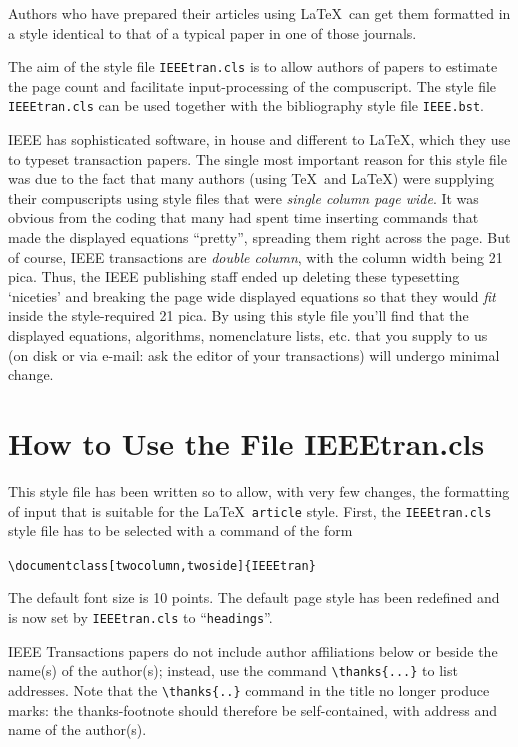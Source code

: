 \documentclass[journal,transmag]{IEEEtran}
\begin{document}
Authors who have prepared their articles using \LaTeX\
can get them formatted in a style identical to that of a typical paper
in one of those journals.

The aim of the style file {\tt IEEEtran.cls} is to allow authors of
papers to estimate the page count and facilitate input-processing of
the compuscript.  The style file {\tt IEEEtran.cls} can be used
together with the bibliography style file {\tt IEEE.bst}.

IEEE has sophisticated software, in house and different to \LaTeX,
which they use to typeset transaction papers. The single most
important reason for this style file was due to the fact that many
authors (using \TeX\ and \LaTeX) were supplying their compuscripts
using style files that were {\em single column page wide}. It was
obvious from the coding that many had spent time inserting commands
that made the displayed equations ``pretty'', spreading them right
across the page.  But of course, IEEE transactions are {\em double
column}, with the column width being 21 pica. Thus, the IEEE publishing
staff ended up deleting these typesetting `niceties' and breaking the
page wide displayed equations so that they would {\em fit} inside the
style-required 21 pica. By using this style file you'll find that the
displayed equations, algorithms, nomenclature lists, etc. that you
supply to us (on disk or via e-mail: ask the editor of your
transactions) will undergo minimal change.
%


\section{How to Use the File IEEEtran.cls}
This style file has been written so to allow, with very few changes,
the formatting of input that is suitable for the \LaTeX\ {\tt article}
style.
First,  the \verb+IEEEtran.cls+ style file has to be
selected with a command of the form
\begin{center}
\verb+\documentclass[twocolumn,twoside]{IEEEtran}+
\end{center}

The default font size is 10 points.  The default page style has been
redefined and is now set by {\tt IEEEtran.cls} to ``\verb+headings+''.

IEEE Transactions papers do not include author affiliations below or beside
the name(s) of the author(s); instead, use the command
\verb+\thanks{...}+ to list addresses. Note that the
\verb+\thanks{..}+ command in the title no longer produce marks:
the thanks-footnote should therefore be self-contained, with address
and name of the author(s).
\end{document}
